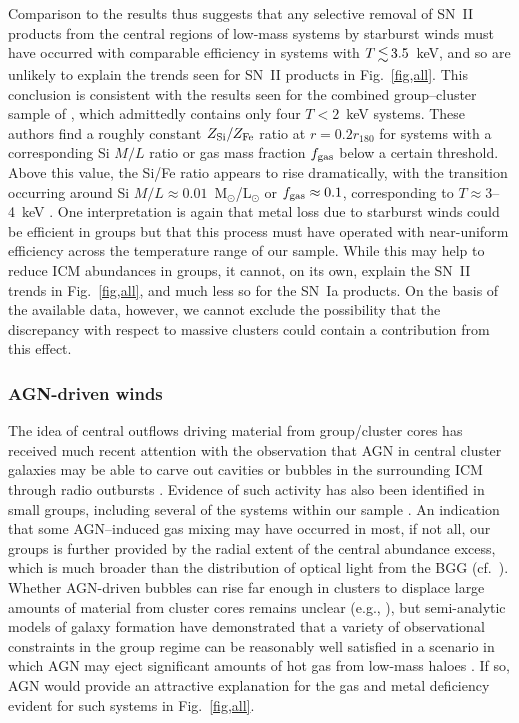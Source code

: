 \documentclass[useAMS,usenatbib]{mn2e}
\begin{document}
Comparison to the \cite{sato07} results thus suggests that any
selective removal of SN~II products from the central regions of
low-mass systems by starburst winds must have occurred with comparable
efficiency in systems with $T\la 3.5$~keV, and so are unlikely to
explain the trends seen for SN~II products in Fig.~\ref{fig,all}. This
conclusion is consistent with the results seen for the combined
group--cluster sample of \citet{fino00}, which admittedly contains
only four $T<2$~keV systems.  These authors find a roughly constant
$Z_{\rm Si}/Z_{\rm Fe}$ ratio at $r=0.2r_{180}$ for systems with a
corresponding Si $M/L$ ratio or gas mass fraction $f_{\rm gas}$ below
a certain threshold. Above this value, the Si/Fe ratio appears to rise
dramatically, with the transition occurring around Si $M/L \approx
0.01$~M$_\odot$/L$_\odot$ or $f_{\rm gas}\approx 0.1$, corresponding
to $T \approx$3--4~keV \citep{fino01}. One interpretation is again
that metal loss due to starburst winds could be efficient in groups
but that this process must have operated with near-uniform efficiency
across the temperature range of our sample. While this may help to
reduce ICM abundances in groups, it cannot, on its own, explain the
SN~II trends in Fig.~\ref{fig,all}, and much less so for the SN~Ia
products. On the basis of the available data, however, we cannot
exclude the possibility that the discrepancy with respect to massive
clusters could contain a contribution from this effect.



\subsubsection{AGN-driven winds}\label{sec,agn}

The idea of central outflows driving material from group/cluster cores
has received much recent attention with the observation that AGN in
central cluster galaxies may be able to carve out cavities or bubbles
in the surrounding ICM through radio outbursts \citep{mcna07}.
Evidence of such activity has also been identified in small groups,
including several of the systems within our sample
\citep{alle06,mori06,jeth08,gast09}. An indication that some 
AGN--induced gas
mixing may have occurred in most, if not all, our groups is further
provided by the radial extent of the central abundance excess, which
is much broader than the distribution of optical light from the BGG
(cf.\ \citealt{rebu06}). Whether AGN-driven bubbles can rise far
enough in clusters to displace large amounts of material from cluster
cores remains unclear (e.g., \citealt{roed07}), but semi-analytic
models of galaxy formation have demonstrated that a variety of
observational constraints in the group regime can be reasonably well
satisfied in a scenario in which AGN may eject significant amounts of
hot gas from low-mass haloes \citep*{bowe08}. If so, AGN would provide
an attractive explanation for the gas and metal deficiency evident for
such systems in Fig.~\ref{fig,all}.
\end{document}
